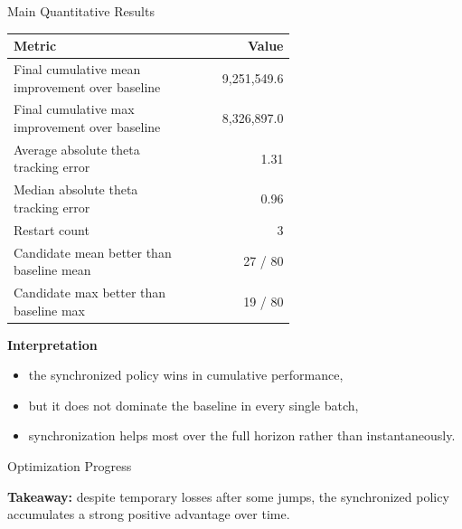 \documentclass[aspectratio=169,11pt]{beamer}
\begin{document}
\begin{frame}{Main Quantitative Results}
    \begin{table}
    \centering
    \begin{tabular}{p{0.62\linewidth}r}
    \toprule
    Metric & Value \\
    \midrule
    Final cumulative mean improvement over baseline & 9,251,549.6 \\
    Final cumulative max improvement over baseline & 8,326,897.0 \\
    Average absolute theta tracking error & 1.31 \\
    Median absolute theta tracking error & 0.96 \\
    Restart count & 3 \\
    Candidate mean better than baseline mean & 27 / 80 \\
    Candidate max better than baseline max & 19 / 80 \\
    \bottomrule
    \end{tabular}
    \end{table}

    \textbf{Interpretation}
    \begin{itemize}
        \item the synchronized policy wins in cumulative performance,
        \item but it does not dominate the baseline in every single batch,
        \item synchronization helps most over the full horizon rather than instantaneously.
    \end{itemize}
\end{frame}

\begin{frame}{Optimization Progress}
    \begin{center}
    \end{center}

    \textbf{Takeaway:}
    despite temporary losses after some jumps, the synchronized policy accumulates a strong positive advantage over time.
\end{frame}
\end{document}

